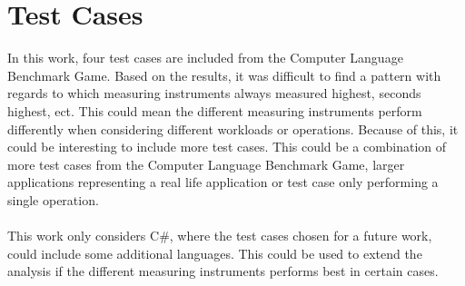 \section{Test Cases}

In this work, four test cases are included from the Computer Language Benchmark Game. Based on the results, it was difficult to find a pattern with regards to which measuring instruments always measured highest, seconds highest, ect. This could mean the different measuring instruments perform differently when considering different workloads or operations. Because of this, it could be interesting to include more test cases. This could be a combination of more test cases from the Computer Language Benchmark Game, larger applications representing a real life application or test case only performing a single operation.

\paragraph*{}
This work only considers C\#, where the test cases chosen for a future work, could include some additional languages. This could be used to extend the analysis if the different measuring instruments performs best in certain cases.
